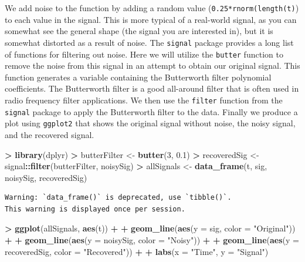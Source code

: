 \documentclass[
]{krantz}
\makeatletter
\newenvironment{Shaded}{\begin{snugshade}}{\end{snugshade}}
\newcommand{\DataTypeTok}[1]{\textcolor[rgb]{0.27,0.27,0.27}{#1}}
\newcommand{\DecValTok}[1]{\textcolor[rgb]{0.06,0.06,0.06}{#1}}
\newcommand{\FloatTok}[1]{\textcolor[rgb]{0.06,0.06,0.06}{#1}}
\newcommand{\KeywordTok}[1]{\textcolor[rgb]{0.27,0.27,0.27}{\textbf{#1}}}
\newcommand{\NormalTok}[1]{#1}
\newcommand{\OperatorTok}[1]{\textcolor[rgb]{0.43,0.43,0.43}{\textbf{#1}}}
\newcommand{\StringTok}[1]{\textcolor[rgb]{0.5,0.5,0.5}{#1}}
\newenvironment{kframe}{%
\medskip{}
\setlength{\fboxsep}{.8em}
 \def\at@end@of@kframe{}%
 \ifinner\ifhmode%
  \def\at@end@of@kframe{\end{minipage}}%
  \begin{minipage}{\columnwidth}%
 \fi\fi%
 \def\FrameCommand##1{\hskip\@totalleftmargin \hskip-\fboxsep
 \colorbox{shadecolor}{##1}\hskip-\fboxsep
     \hskip-\linewidth \hskip-\@totalleftmargin \hskip\columnwidth}%
 \MakeFramed {\advance\hsize-\width
   \@totalleftmargin\z@ \linewidth\hsize
   \@setminipage}}%
 {\par\unskip\endMakeFramed%
 \at@end@of@kframe}
\renewenvironment{Shaded}{\begin{kframe}}{\end{kframe}}
\makeatother
\begin{document}
We add noise to the function by adding a random value (\texttt{0.25*rnorm(length(t)}) to each value in the signal. This is more typical of a real-world signal, as you can somewhat see the general shape (the signal you are interested in), but it is somewhat distorted as a result of noise. The \texttt{signal} package provides a long list of functions for filtering out noise. Here we will utilize the \texttt{butter} function to remove the noise from this signal in an attempt to obtain our original signal. This function generates a variable containing the Butterworth filter polynomial coefficients. The Butterworth filter is a good all-around filter that is often used in radio frequency filter applications. We then use the \texttt{filter} function from the \texttt{signal} package to apply the Butterworth filter to the data. Finally we produce a plot using \texttt{ggplot2} that shows the original signal without noise, the noisy signal, and the recovered signal.

\begin{Shaded}
\begin{Highlighting}[]
\OperatorTok{\textgreater{}}\StringTok{ }\KeywordTok{library}\NormalTok{(dplyr)}
\OperatorTok{\textgreater{}}\StringTok{ }\NormalTok{butterFilter \textless{}{-}}\StringTok{ }\KeywordTok{butter}\NormalTok{(}\DecValTok{3}\NormalTok{, }\FloatTok{0.1}\NormalTok{)}
\OperatorTok{\textgreater{}}\StringTok{ }\NormalTok{recoveredSig \textless{}{-}}\StringTok{ }\NormalTok{signal}\OperatorTok{::}\KeywordTok{filter}\NormalTok{(butterFilter, noisySig)}
\OperatorTok{\textgreater{}}\StringTok{ }\NormalTok{allSignals \textless{}{-}}\StringTok{ }\KeywordTok{data\_frame}\NormalTok{(t, sig, noisySig, recoveredSig)}
\end{Highlighting}
\end{Shaded}

\begin{verbatim}
Warning: `data_frame()` is deprecated, use `tibble()`.
This warning is displayed once per session.
\end{verbatim}

\begin{Shaded}
\begin{Highlighting}[]
\OperatorTok{\textgreater{}}\StringTok{ }\KeywordTok{ggplot}\NormalTok{(allSignals, }\KeywordTok{aes}\NormalTok{(t)) }\OperatorTok{+}\StringTok{ }
\OperatorTok{+}\StringTok{   }\KeywordTok{geom\_line}\NormalTok{(}\KeywordTok{aes}\NormalTok{(}\DataTypeTok{y =}\NormalTok{ sig, }\DataTypeTok{color =} \StringTok{"Original"}\NormalTok{)) }\OperatorTok{+}\StringTok{ }
\OperatorTok{+}\StringTok{   }\KeywordTok{geom\_line}\NormalTok{(}\KeywordTok{aes}\NormalTok{(}\DataTypeTok{y =}\NormalTok{ noisySig, }\DataTypeTok{color =} \StringTok{"Noisy"}\NormalTok{)) }\OperatorTok{+}\StringTok{ }
\OperatorTok{+}\StringTok{   }\KeywordTok{geom\_line}\NormalTok{(}\KeywordTok{aes}\NormalTok{(}\DataTypeTok{y =}\NormalTok{ recoveredSig, }\DataTypeTok{color =} \StringTok{"Recovered"}\NormalTok{)) }\OperatorTok{+}\StringTok{ }
\OperatorTok{+}\StringTok{   }\KeywordTok{labs}\NormalTok{(}\DataTypeTok{x =} \StringTok{"Time"}\NormalTok{, }\DataTypeTok{y =} \StringTok{"Signal"}\NormalTok{)}
\end{Highlighting}
\end{Shaded}
\end{document}
